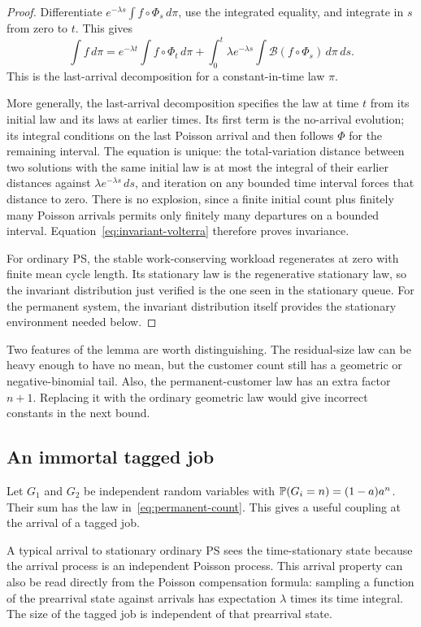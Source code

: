 \begin{proof}
Differentiate $e^{-\lambda s}\int f\circ\Phi_s\,d\pi$, use the integrated equality, and integrate in $s$ from zero to $t$. This gives
\begin{equation}\label{eq:invariant-volterra}
 \int f\,d\pi
 =e^{-\lambda t}\int f\circ\Phi_t\,d\pi
  +\int_0^t\lambda e^{-\lambda s}
       \int \mathcal B(f\circ\Phi_s)\,d\pi\,ds.
\end{equation}
This is the last-arrival decomposition for a constant-in-time law $\pi$.

More generally, the last-arrival decomposition specifies the law at time $t$ from its initial law and its laws at earlier times. Its first term is the no-arrival evolution; its integral conditions on the last Poisson arrival and then follows $\Phi$ for the remaining interval. The equation is unique: the total-variation distance between two solutions with the same initial law is at most the integral of their earlier distances against $\lambda e^{-\lambda s}\,ds$, and iteration on any bounded time interval forces that distance to zero. There is no explosion, since a finite initial count plus finitely many Poisson arrivals permits only finitely many departures on a bounded interval. Equation~\eqref{eq:invariant-volterra} therefore proves invariance.

For ordinary PS, the stable work-conserving workload regenerates at zero with finite mean cycle length. Its stationary law is the regenerative stationary law, so the invariant distribution just verified is the one seen in the stationary queue. For the permanent system, the invariant distribution itself provides the stationary environment needed below.
\end{proof}

Two features of the lemma are worth distinguishing. The residual-size law can be heavy enough to have no mean, but the customer count still has a geometric or negative-binomial tail. Also, the permanent-customer law has an extra factor $n+1$. Replacing it with the ordinary geometric law would give incorrect constants in the next bound.

\subsection{An immortal tagged job}
Let $G_1$ and $G_2$ be independent random variables with $\mathbb P(G_i=n)=(1-a)a^n$. Their sum has the law in~\eqref{eq:permanent-count}. This gives a useful coupling at the arrival of a tagged job.

A typical arrival to stationary ordinary PS sees the time-stationary state because the arrival process is an independent Poisson process. This arrival property can also be read directly from the Poisson compensation formula: sampling a function of the prearrival state against arrivals has expectation $\lambda$ times its time integral. The size of the tagged job is independent of that prearrival state.

